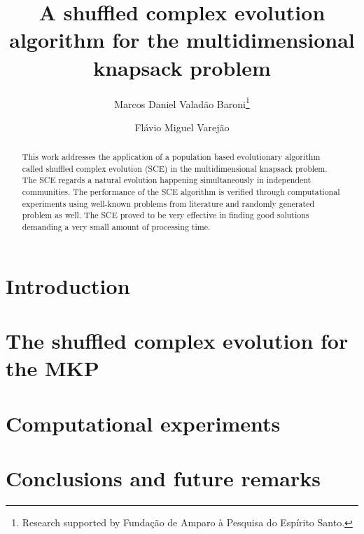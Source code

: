 \documentclass{llncs}
\begin{document}

\pagestyle{headings}  %

\title{A shuffled complex evolution algorithm for
the multidimensional knapsack problem}

\author{
   Marcos Daniel Valad\~ao Baroni\thanks{Research supported by Funda\c c\~ao de Amparo \`a Pesquisa do Esp\'irito Santo.}
   \and
   Fl\'avio Miguel Varej\~ao
}


\maketitle              %

\begin{abstract}
This work addresses the application of
a population based evolutionary algorithm
called shuffled complex evolution (SCE) in the multidimensional knapsack
problem.
The SCE regards a natural evolution happening simultaneously in independent communities.
The performance of the SCE algorithm is verified through computational experiments
using well-known problems from literature and randomly generated problem as well.
The SCE proved to be very effective in finding good solutions demanding a
very small amount of processing time.
\end{abstract}

\section{Introduction}
\label{sec:intro}


\section{The shuffled complex evolution for the MKP}
\label{sec:sce}


\section{Computational experiments}
\label{sec:exp}


\section{Conclusions and future remarks}
\label{sec:conc}




\end{document}
